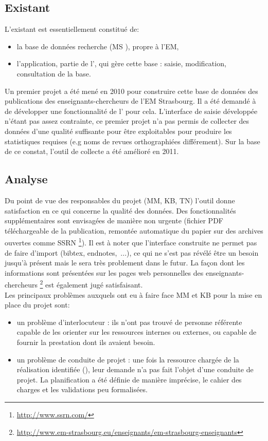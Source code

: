 \documentclass{book}
\begin{document}
\subsection{Existant}

L'existant est essentiellement constitué de:
\begin{itemize}
\item la base de données recherche (MS ), propre à l'EM,
\item l'application, partie de l', qui gère cette base : 
saisie, modification, consultation de la base.
\end{itemize}
Un premier projet a été mené en 2010 pour construire cette base de données des
publications des enseignants-chercheurs de l'EM Strasbourg. Il a été demandé à 
\CK de développer une fonctionnalité de l' pour cela. L'interface 
de saisie développée n'étant pas assez contrainte, ce premier projet n'a pas 
permis de collecter des données d'une qualité suffisante pour être exploitables
pour produire les statistiques requises (e.g noms de revues orthographiées 
différement). Sur la base de ce constat, l'outil de collecte a été amélioré en 
2011. 

\subsection{Analyse}

Du point de vue des responsables du projet (MM, KB, TN) l'outil donne 
satisfaction en ce qui concerne la qualité des données. Des fonctionnalités 
supplémentaires sont envisagées de manière non urgente (fichier PDF téléchargeable 
de la publication, remontée automatique du papier sur des archives ouvertes comme SSRN%
\footnote{\url{ http://www.ssrn.com/}}).
Il est à noter que l'interface construite ne permet pas de faire d'import (bibtex, 
endnotes,~...), ce qui ne s'est pas révélé être un besoin jusqu'à présent mais
le sera très problement dans le futur. 
La façon dont les informations sont présentées sur les pages web personnelles
des enseignants-chercheurs%
\footnote{\url{http://www.em-strasbourg.eu/enseignants/em-strasbourg-enseignants}}
est également jugé satisfaisant.\\

Les principaux problèmes auxquels ont eu à faire face MM et KB pour la mise 
en place du projet sont:
\begin{itemize}
\item un problème d'interlocuteur : ils n'ont pas trouvé de personne référente
capable de les orienter sur les ressources internes ou externes, ou capable de 
fournir la prestation dont ils avaient besoin.
\item un problème de conduite de projet : une fois la ressource chargée de la 
réalisation identifiée (\CK), leur demande n'a pas fait l'objet d'une conduite
de projet. La planification a été définie de manière imprécise, le cahier des 
charges et les validations peu formalisées.
\end{itemize}
\end{document}
